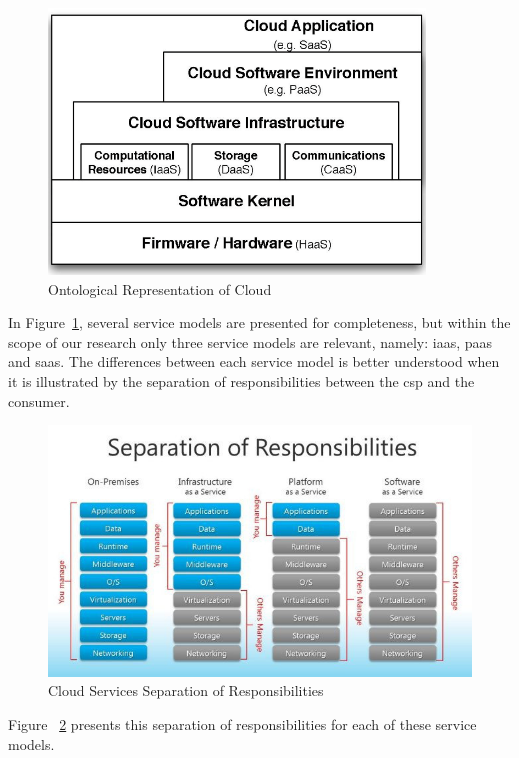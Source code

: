 \documentclass[12pt, titlepage]{uo_temp}
\begin{document}
       \begin{figure}[h!]
         \centering
	 \includegraphics[width=100mm]{images/c_ontology.png}
	 \caption{Ontological Representation of Cloud\label{c_ontology} \cite{ontology}}
       \end{figure}

       In Figure~\ref{c_ontology}, several service models are presented for completeness,
       but within the scope of our research only three service models are relevant,
       namely: \gls{iaas}, \gls{paas} and \gls{saas}. The differences between each
       service model is better understood when it is illustrated by the separation of
       responsibilities between the \gls{csp} and the consumer.

       \begin{figure}[h!]
         \centering
	 \includegraphics[width=125mm]{images/cloud_sep_of_resp.jpg}
	 \caption{Cloud Services Separation of Responsibilities\label{cloud_sep_of_resp}
           \cite{blewis}}
       \end{figure}

     Figure ~\ref{cloud_sep_of_resp} presents this separation of responsibilities for
     each of these service models.
\end{document}
